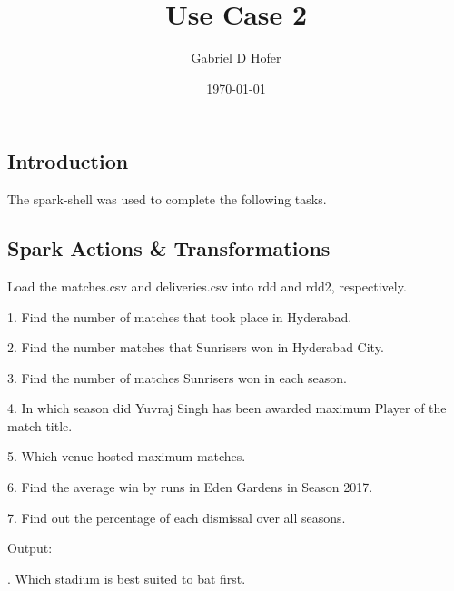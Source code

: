 \documentclass{article}
\title{Use Case 2}
\author{Gabriel D Hofer}
\date\today
\begin{document}
\maketitle

\subsection*{Introduction}
The spark-shell was used to complete the following tasks. 

\subsection*{Spark Actions \& Transformations}

Load the matches.csv and deliveries.csv into rdd and rdd2, respectively.


1. Find the number of matches that took place in Hyderabad.


2. Find the number matches that Sunrisers won in Hyderabad City.

\newpage

3. Find the number of matches Sunrisers won in each season.


4. In which season did Yuvraj Singh has been awarded maximum Player of the match title.


5. Which venue hosted maximum matches.


6. Find the average win by runs in Eden Gardens in Season 2017.

\newpage

7. Find out the percentage of each dismissal over all seasons.

Output: 


. Which stadium is best suited to bat first.



\end{document}
